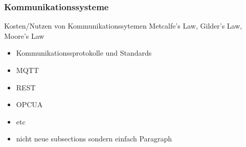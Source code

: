 \subsubsection{Kommunikationssysteme}
Kosten/Nutzen von Kommunikationssytemen
Metcalfe’s Law, Gilder’s Law, Moore’s Law
\begin{itemize}
  \item Kommunikationssprotokolle und Standards
  \item MQTT
  \item REST
  \item OPCUA
  \item etc
  \item nicht neue subsections sondern einfach Paragraph
\end{itemize}

